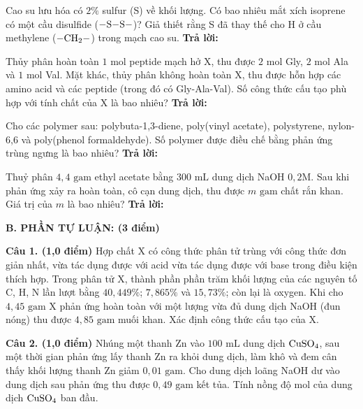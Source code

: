 \documentclass[11pt,a4paper]{article}
\begin{document}
\begin{ex}
Cao su lưu hóa có $2\%$ sulfur (S) về khối lượng. Có bao nhiêu mắt xích isoprene có một cầu disulfide ($\ce{-S-S-}$)? Giả thiết rằng S đã thay thế cho H ở cầu methylene ($-\ce{CH2}-$) trong mạch cao su.
\hfill \textbf{Trả lời:} \dotfill
\end{ex}
\begin{ex}
Thủy phân hoàn toàn $1\text{ mol}$ peptide mạch hở X, thu được $2\text{ mol}$ Gly, $2\text{ mol}$ Ala và $1\text{ mol}$ Val. Mặt khác, thủy phân không hoàn toàn X, thu được hỗn hợp các amino acid và các peptide (trong đó có Gly-Ala-Val). Số công thức cấu tạo phù hợp với tính chất của X là bao nhiêu?
\hfill \textbf{Trả lời:} \dotfill
\end{ex}
\begin{ex}
Cho các polymer sau: polybuta-1,3-diene, poly(vinyl acetate), polystyrene, nylon-6,6 và poly(phenol formaldehyde). Số polymer được điều chế bằng phản ứng trùng ngưng là bao nhiêu?
\hfill \textbf{Trả lời:} \dotfill
\end{ex}
\begin{ex}
Thuỷ phân $4,4\text{ gam}$ ethyl acetate bằng $300\text{ mL}$ dung dịch NaOH $0,2\text{M}$. Sau khi phản ứng xảy ra hoàn toàn, cô cạn dung dịch, thu được $m\text{ gam}$ chất rắn khan. Giá trị của $m$ là bao nhiêu?
\hfill \textbf{Trả lời:} \dotfill
\end{ex}
\vspace{4pt}
\noindent
{\color{mainGreen}\textbf{\Large B. PHẦN TỰ LUẬN: (3 điểm)}}

\vspace{3pt}

\noindent
\textbf{Câu 1. (1,0 điểm)} Hợp chất X có công thức phân tử trùng với công thức đơn giản nhất, vừa tác dụng được với acid vừa tác dụng được với base trong điều kiện thích hợp. Trong phân tử X, thành phần phần trăm khối lượng của các nguyên tố C, H, N lần lượt bằng $40,449\%$; $7,865\%$ và $15,73\%$; còn lại là oxygen. Khi cho $4,45\text{ gam}$ X phản ứng hoàn toàn với một lượng vừa đủ dung dịch NaOH (đun nóng) thu được $4,85\text{ gam}$ muối khan. Xác định công thức cấu tạo của X.

\vspace{2pt}

\vspace{4pt}
\noindent
\textbf{Câu 2. (1,0 điểm)} Nhúng một thanh Zn vào $100\text{ mL}$ dung dịch $\ce{CuSO4}$, sau một thời gian phản ứng lấy thanh Zn ra khỏi dung dịch, làm khô và đem cân thấy khối lượng thanh Zn giảm $0,01\text{ gam}$. Cho dung dịch loãng NaOH dư vào dung dịch sau phản ứng thu được $0,49\text{ gam}$ kết tủa. Tính nồng độ mol của dung dịch $\ce{CuSO4}$ ban đầu.
\end{document}
